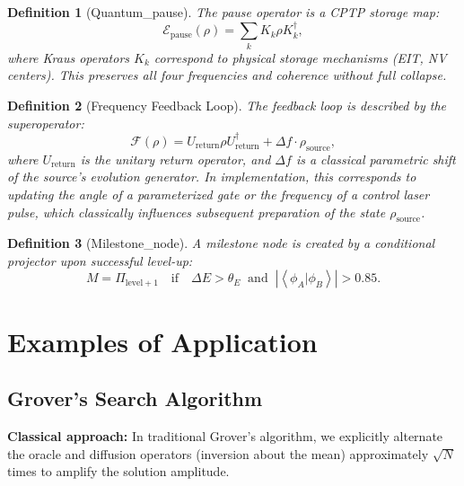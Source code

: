 \documentclass[11pt,a4paper]{article}
\newcommand{\braket}[2]{\left\langle#1|#2\right\rangle}
\newtheorem{definition}{Definition}
\begin{document}
\begin{definition}[Quantum\_pause]
The pause operator is a CPTP storage map:
\begin{equation}
    \mathcal{E}_{\text{pause}}(\rho) = \sum_k K_k \rho K_k^\dagger,
\end{equation}
where Kraus operators $K_k$ correspond to physical storage mechanisms (EIT, NV centers). This preserves all four frequencies and coherence without full collapse.
\end{definition}

\begin{definition}[Frequency Feedback Loop]
The feedback loop is described by the superoperator:
\begin{equation}
    \mathcal{F}(\rho) = U_{\text{return}} \rho U_{\text{return}}^\dagger + \Delta f \cdot \rho_{\text{source}},
\end{equation}
where $U_{\text{return}}$ is the unitary return operator, and $\Delta f$ is a classical parametric shift of the source's evolution generator. In implementation, this corresponds to updating the angle of a parameterized gate or the frequency of a control laser pulse, which classically influences subsequent preparation of the state $\rho_{\text{source}}$.
\end{definition}

\begin{definition}[Milestone\_node]
A milestone node is created by a conditional projector upon successful level-up:
\begin{equation}
    M = \Pi_{\text{level}+1} \quad \text{if} \quad \Delta E > \theta_E \;\; \text{and} \;\; |\braket{\phi_A}{\phi_B}| > 0.85.
\end{equation}
\end{definition}

\section{Examples of Application}

\subsection{Grover's Search Algorithm}

\textbf{Classical approach:} In traditional Grover's algorithm, we explicitly alternate the oracle and diffusion operators (inversion about the mean) approximately $\sqrt{N}$ times to amplify the solution amplitude.
\end{document}
